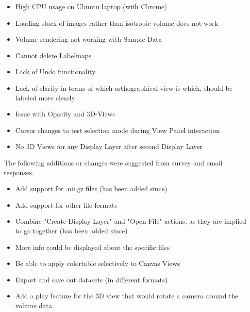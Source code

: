\documentclass[a4paper,11pt,twoside]{article}
\begin{document}
\begin{itemize}
\item High CPU usage on Ubuntu laptop (with Chrome)
\item Loading stack of images rather than isotropic volume does not work
\item Volume rendering not working with Sample Data
\item Cannot delete Labelmaps
\item Lack of Undo functionality
\item Lack of clarity in terms of which orthographical view is which, should be labeled more clearly
\item Issue with Opacity and 3D-Views
\item Cursor changes to test selection mode during View Panel interaction
\item No 3D Views for any Display Layer after second Display Layer
\end{itemize}


The following additions or changes were suggested from survey and email responses.

\begin{itemize}
\item Add support for .nii.gz files (has been added since)
\item Add support for other file formats
\item Combine "Create Display Layer" and "Open File" actions, as they are implied to go together (has been added since)
\item More info could be displayed about the specific files
\item Be able to apply colortable selectively to Canvas Views
\item Export and save out datasets (in different formats)
\item Add a play feature for the 3D view that would rotate a camera around the volume data
\end{itemize}
\end{document}
